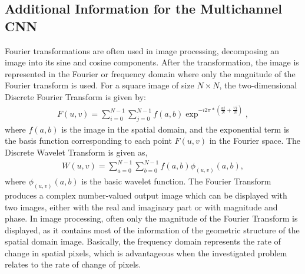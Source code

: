 \documentclass[11pt, authoryear]{elsarticle}
\begin{document}
\begin{appendix}
		\subsection{Additional Information for the Multichannel CNN}
		Fourier transformations are often used in image processing, decomposing an 
		image into its sine and cosine components. After the transformation, the image 
		is represented in the Fourier or frequency domain where only the magnitude
		of the Fourier transform is used.
		For a square image of size $N \times N$, the two-dimensional Discrete Fourier 
		Transform is given by:
		\begin{align}
			\label{eq:fft}
			F(u, v) = \sum_{i=0}^{N-1}\sum_{j=0}^{N-1} f(a, b) \exp^{-i2\pi*(\frac{ui}{N}+\frac{vj}{N})},
		\end{align}
		where $f(a,b)$ is the image in the spatial domain, and the exponential term is the basis function corresponding to each point $F(u,v)$ in the Fourier space. 
		The Discrete Wavelet Transform is given as,
		\begin{align}
			\label{eq:dwt}
			W(u, v) = \sum_{a=0}^{N-1}\sum_{b=0}^{N-1} f(a, b) \phi_{(u,v)}(a, b),
		\end{align}
		where $\phi_{(u,v)}(a, b)$ is the basic wavelet function.
		The Fourier Transform produces a complex number-valued output image which can 
		be displayed with two images, either with the real and imaginary part or with
		magnitude and phase. In image processing, often only the magnitude of the Fourier
		Transform is displayed, as it contains most of the information of the geometric
		structure of the spatial domain image.
		Basically, the frequency domain represents the rate of change in spatial 
		pixels, which is advantageous when the investigated problem  relates to the rate 
		of change of pixels. 
		
		
		

\end{appendix}
\end{document}
